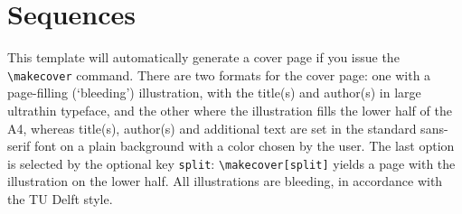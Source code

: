 \section{Sequences}

This template will automatically generate a cover page if you issue the \texttt{\textbackslash makecover} command. There are two formats for the cover page: one with a page-filling (`bleeding')
illustration, with the title(s) and author(s) in large ultrathin typeface, and the other where the illustration fills the lower half of the A4, whereas title(s), author(s) and additional
text are set in the standard sans-serif font on a plain background with a color chosen by the user. The last option is selected by the optional key \texttt{split}: \texttt{\textbackslash makecover[split]} yields
a page with the illustration on the lower half. All illustrations are bleeding, in accordance with the TU Delft style.

